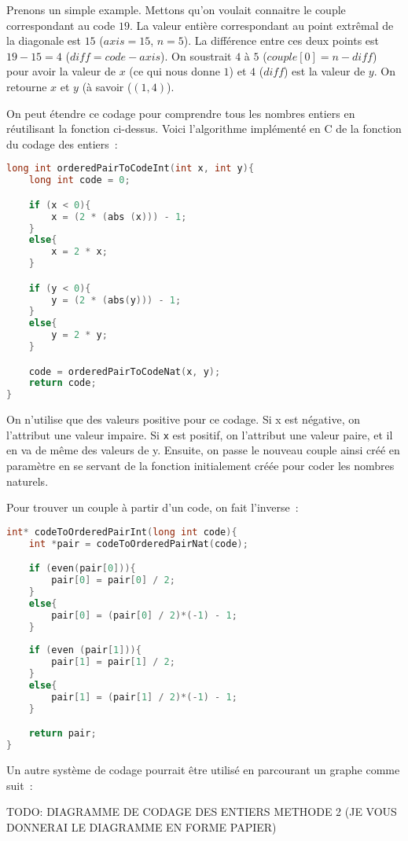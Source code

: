 \documentclass{article}
\begin{document}
Prenons un simple example. Mettons qu'on voulait connaitre le couple correspondant au code $19$. La valeur entière  correspondant au point extrêmal de la diagonale est $15$ ($axis = 15$, $n = 5$). La différence entre ces deux points est $19 - 15 = 4$ ($diff = code - axis$). On soustrait $4$ à $5$ ($couple[0] = n - diff$) pour avoir la valeur de $x$ (ce qui nous donne $1$) et $4$ ($diff$) est la valeur de $y$. On retourne $x$ et $y$ (à savoir ($(1,4)$).

On peut étendre ce codage pour comprendre tous les nombres entiers en réutilisant la fonction ci-dessus. Voici l'algorithme implémenté en C de la fonction du codage des entiers~:

\begin{lstlisting}[language=C]
long int orderedPairToCodeInt(int x, int y){
	long int code = 0;	

	if (x < 0){
		x = (2 * (abs (x))) - 1;
	}
	else{
		x = 2 * x;
	}

	if (y < 0){
		y = (2 * (abs(y))) - 1;
	}
	else{
		y = 2 * y;
	}

	code = orderedPairToCodeNat(x, y);
	return code;
}
\end{lstlisting}


On n'utilise que des valeurs positive pour ce codage. Si x est négative, on l'attribut une valeur impaire. Si \lstinline!x! est positif, on l'attribut une valeur paire, et il en va de même des valeurs de y. Ensuite, on passe le nouveau couple ainsi créé en paramètre en se servant de la fonction initialement créée pour coder les nombres naturels. 


Pour trouver un couple à partir d'un code, on fait l'inverse~:

\begin{lstlisting}[language=C]
int* codeToOrderedPairInt(long int code){
	int *pair = codeToOrderedPairNat(code);

	if (even(pair[0])){
		pair[0] = pair[0] / 2;
	}
	else{
		pair[0] = (pair[0] / 2)*(-1) - 1;
	} 
	
	if (even (pair[1])){
		pair[1] = pair[1] / 2;
	}
	else{
		pair[1] = (pair[1] / 2)*(-1) - 1;
	}

	return pair;
}
\end{lstlisting}  


Un autre système de codage pourrait être utilisé en parcourant un graphe comme suit~:

TODO: DIAGRAMME DE CODAGE DES ENTIERS METHODE 2 (JE VOUS DONNERAI LE DIAGRAMME EN FORME PAPIER) 
\end{document}
